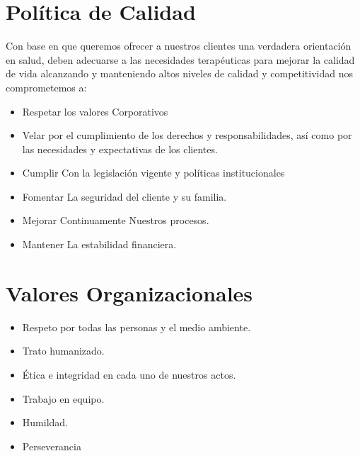 \section{Pol\'itica de Calidad}
Con base en que queremos ofrecer a nuestros clientes  una verdadera orientación en salud, deben adecuarse a las necesidades terapéuticas para mejorar la calidad de vida alcanzando y manteniendo  altos niveles de calidad y competitividad nos comprometemos a:
\begin{itemize}
\item Respetar los valores Corporativos
\item Velar por el cumplimiento de los derechos y responsabilidades, así como por las necesidades y expectativas de los clientes. 
\item Cumplir Con la legislación vigente y políticas institucionales 
\item Fomentar La seguridad del cliente y  su familia.
\item Mejorar Continuamente Nuestros procesos.
\item Mantener La estabilidad financiera.
\end{itemize}

\section{Valores Organizacionales}
\begin{itemize}
\item Respeto por todas las personas y el medio ambiente.
\item Trato humanizado.
\item Ética e integridad en cada uno de nuestros actos.
\item Trabajo en equipo.
\item Humildad.
\item Perseverancia
\end{itemize}

